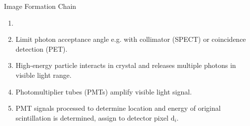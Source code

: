 



\begin{frame}[c]{Image Formation Chain}
    \begin{enumerate}
        \setlength\itemsep{0.3cm}
        \item \textbf{\large \color{faublue}{Photon emission}}

        \item \textbf{\large \color{faublue}{Projection}}

              Limit photon acceptance angle e.g. with collimator (SPECT) or coincidence detection (PET).

        \item \textbf{\large \color{faublue}{Scintillation}}

              High-energy particle interacts in crystal and releases multiple photons in visible light range.

        \item \textbf{\large \color{faublue}{Amplification}}

              Photomultiplier tubes (PMTs) amplify visible light signal.

        \item \textbf{\large \color{faublue}{Signal Processing}}

              PMT signals processed to determine location and energy of original scintillation is determined, assign to detector pixel $\text{d}_{i}$.
    \end{enumerate}
\end{frame}


